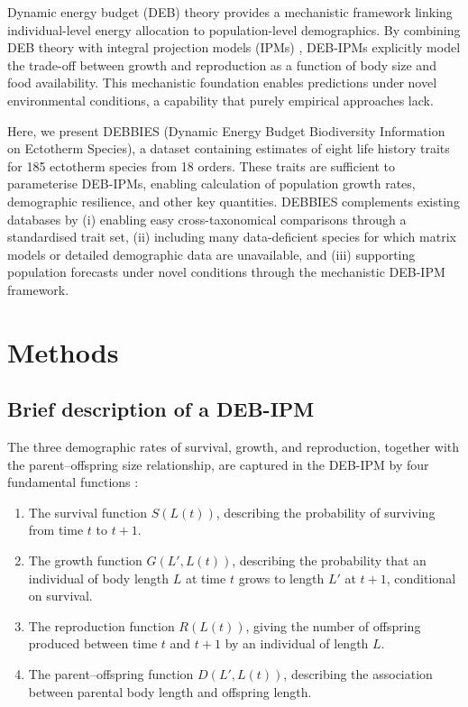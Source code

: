 \documentclass[11pt]{article}
\begin{document}
Dynamic energy budget (DEB) theory \citep{kooijman2010,kooijman2019} provides a mechanistic framework linking individual-level energy allocation to population-level demographics. By combining DEB theory with integral projection models (IPMs) \citep{ellner2012,merow2014}, DEB-IPMs \citep{smallegange2017} explicitly model the trade-off between growth and reproduction as a function of body size and food availability. This mechanistic foundation enables predictions under novel environmental conditions, a capability that purely empirical approaches lack.

Here, we present DEBBIES (Dynamic Energy Budget Biodiversity Information on Ectotherm Species), a dataset containing estimates of eight life history traits for 185 ectotherm species from 18 orders. These traits are sufficient to parameterise DEB-IPMs, enabling calculation of population growth rates, demographic resilience, and other key quantities. DEBBIES complements existing databases by (i) enabling easy cross-taxonomical comparisons through a standardised trait set, (ii) including many data-deficient species for which matrix models or detailed demographic data are unavailable, and (iii) supporting population forecasts under novel conditions through the mechanistic DEB-IPM framework.

\section{Methods}

\subsection{Brief description of a DEB-IPM}

The three demographic rates of survival, growth, and reproduction, together with the parent--offspring size relationship, are captured in the DEB-IPM by four fundamental functions \citep{smallegange2017,deangelis2000}:

\begin{enumerate}
    \item The survival function $S(L(t))$, describing the probability of surviving from time $t$ to $t+1$.
    \item The growth function $G(L', L(t))$, describing the probability that an individual of body length $L$ at time $t$ grows to length $L'$ at $t+1$, conditional on survival.
    \item The reproduction function $R(L(t))$, giving the number of offspring produced between time $t$ and $t+1$ by an individual of length $L$.
    \item The parent--offspring function $D(L', L(t))$, describing the association between parental body length and offspring length.
\end{enumerate}
\end{document}
